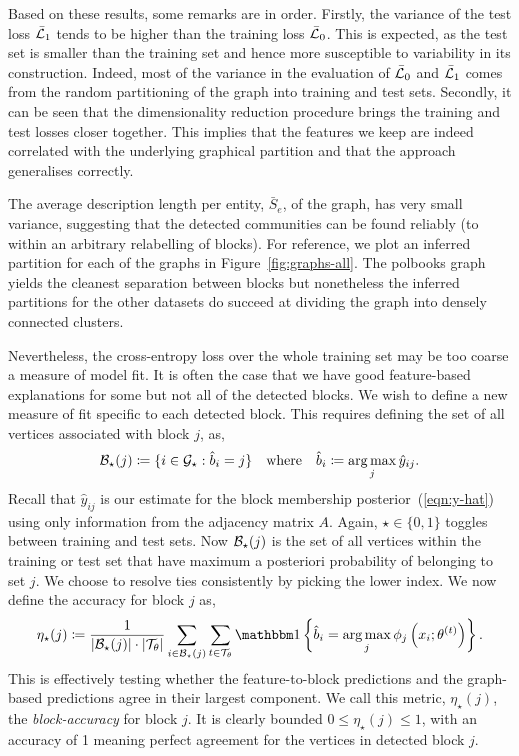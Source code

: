 Based on these results, some remarks are in order.
Firstly, the variance of the test loss $\bar{\mathcal{L}}_1$ tends to be higher 
than the training loss $\bar{\mathcal{L}}_0$. This is expected,
as the test set is smaller than the training set and hence 
more susceptible to variability in its construction. Indeed, 
most of the variance in the evaluation of $\bar{\mathcal{L}}_0$ and $\bar{\mathcal{L}}_1$ 
comes from the random partitioning of the graph into training and test sets. 
Secondly, it can be seen that the dimensionality reduction procedure 
brings the training and test losses closer together. This implies that 
the features we keep are indeed correlated with the underlying graphical 
partition and that the approach generalises correctly.

The average description length per entity,
$\bar{S}_e$, of the graph, 
has very small variance, suggesting that
the detected communities can be found reliably (to within an arbitrary 
relabelling of blocks). For reference, we plot an inferred partition for each 
of the graphs in Figure~\ref{fig:graphs-all}. The polbooks graph yields the cleanest separation between blocks but nonetheless the inferred partitions for the other datasets do succeed at dividing the graph into densely connected clusters.

Nevertheless, the cross-entropy loss over the whole training set may be too coarse a measure of model fit. It is often the case that we have good feature-based explanations for some but not all of the detected blocks. We wish to define a new measure of fit specific to each detected block. This requires defining the set of all vertices associated with block $j$, as,
%
\begin{equation}
	\mathcal{B}_\star(j) \coloneqq \{i \in \mathcal{G}_\star : \hat{b}_i = j\} \quad \textrm{where} 
	\quad \hat{b}_i \coloneqq \operatorname*{arg\,max}_j \hat{y}_{ij}.
\end{equation}
%
Recall that $\hat{y}_{ij}$ is our estimate for the block membership posterior~(\ref{eqn:y-hat}) using only information from the adjacency matrix $A$. Again, $\star \in \{0, 1\}$ toggles between training and test sets. Now $\mathcal{B}_\star(j)$ is the set of all vertices within the training or test set that have maximum a posteriori probability of belonging to set $j$. We choose to resolve ties consistently by picking the lower index. We now define the accuracy for block $j$ as,
%
\begin{equation}
	\eta_\star(j) \coloneqq \frac{1}{|\Bcal_\star (j)| \cdot 
	|\Tcal_\theta| } 
	\sum_{i \in \Bcal_\star (j)}  \sum_{t \in \Tcal_\theta}
	\one \left\{\hat{b}_i = \argmax_j \phi_j \left( x_i; \theta^{(t)} \right) \right\}.
	\label{eqn:accuracy}
\end{equation}
%
This is effectively testing whether the feature-to-block predictions and the graph-based predictions agree in their largest component. We call this metric, $\eta_\star(j)$, the {\em block-accuracy} for block $j$. It is clearly bounded $0 \leq \eta_\star(j) \leq 1$, with an accuracy of 1 meaning perfect agreement for the vertices in detected block $j$.

